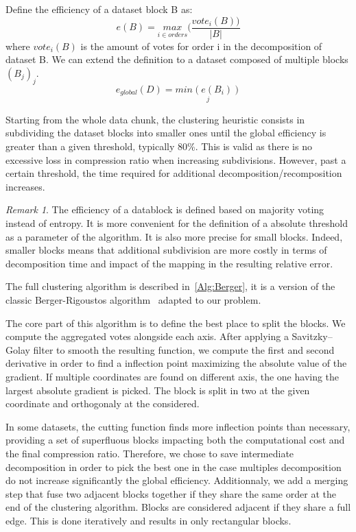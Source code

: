 \documentclass[conference]{IEEEtran}
\theoremstyle{remark}
\newtheorem{rmk}{Remark}
\begin{document}
Define the efficiency of a dataset block B as:
\[e(B) = \underset{i \in orders}{max}( \frac{vote_{i}(B))}{|B|}\] where $vote_{i}(B)$ is the amount of votes for order i in the decomposition of dataset B.
We can extend the definition to a dataset composed of multiple blocks $(B_j)_j$.
\[e_{global}(D) = \underset{j}{min( e(B_i))}\]

Starting from the whole data chunk, the clustering heuristic consists in subdividing the dataset blocks into smaller ones until the global efficiency is greater than a given threshold, typically 80\%.
This is valid as there is no excessive loss in compression ratio when increasing subdivisions. However, past a certain threshold, the time required for additional decomposition/recomposition increases.

\begin{rmk}
    The efficiency of a datablock is defined based on majority voting instead of entropy. It is more convenient for the definition of a absolute threshold as a parameter of the algorithm. It is also more precise for small blocks. Indeed, smaller blocks means that additional subdivision are more costly in terms of decomposition time and impact of the mapping in the resulting relative error. 
\end{rmk}

The full clustering algorithm is described in~\ref{Alg:Berger}, it is a version of the classic Berger-Rigoustos algorithm~\cite{berger1991algorithm}
adapted to our problem.

The core part of this algorithm is to define the best place to split the blocks.
We compute the aggregated votes alongside each axis. After applying a Savitzky–Golay filter to smooth the resulting function, we compute the first and second derivative in order to find a inflection point maximizing the absolute value of the gradient. If multiple coordinates are found on different axis, the one having the largest absolute gradient is picked.
The block is split in two at the given coordinate and orthogonaly at the considered.

In some datasets, the cutting function finds more inflection points than necessary, providing a set of superfluous blocks impacting both the computational cost and the final compression ratio.
Therefore, we chose to save intermediate decomposition in order to pick the best one in the case multiples decomposition do not increase significantly the global efficiency.
Additionnaly, we add a merging step that fuse two adjacent blocks together if they share the same order at the end of the clustering algorithm. Blocks are considered adjacent if they share a full edge. This is done iteratively and results in only rectangular blocks.
\end{document}
